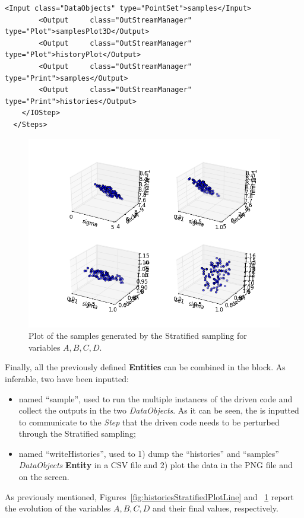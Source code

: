 \begin{enumerate}
\begin{lstlisting}[style=XML,morekeywords={arg,extension,pauseAtEnd,overwrite}]
        <Input class="DataObjects" type="PointSet">samples</Input>
        <Output 	class="OutStreamManager" type="Plot">samplesPlot3D</Output>
        <Output 	class="OutStreamManager" type="Plot">historyPlot</Output>
        <Output 	class="OutStreamManager" type="Print">samples</Output>
        <Output 	class="OutStreamManager" type="Print">histories</Output>
    </IOStep>
  </Steps>
\end{lstlisting}
 \begin{figure}[h!]
  \centering
  \includegraphics[scale=0.7]{pics/Stratified_pointsets.png}
  \caption{Plot of the samples generated by the Stratified sampling for variables $A,B,C,D$.}
  \label{fig:samplesStratifiedPlotLine}
 \end{figure}
   Finally, all the previously defined \textbf{Entities} can be combined in 
   the  block. As inferable, 
   two  have been inputted:
   \begin{itemize}
     \item {} named ``sample'', used to run the multiple  
     instances of the driven code and 
     collect the outputs in the two \textit{DataObjects}. As it can be
     seen, the  is inputted to communicate to the 
     \textit{Step} that the driven code needs to
     be perturbed through the Stratified sampling;
     \item  {} named ``writeHistories'', used to 1) dump 
     the ``histories'' and ``samples'' \textit{DataObjects} 
     \textbf{Entity} in a CSV file and 2) plot the data in the PNG file and 
     on the screen.
   \end{itemize}
\end{enumerate} 
 As previously mentioned, Figures~\ref{fig:historiesStratifiedPlotLine} and ~\ref{fig:samplesStratifiedPlotLine}  report the evolution of the 
 variables $A,B,C,D$ and their final values, respectively.

